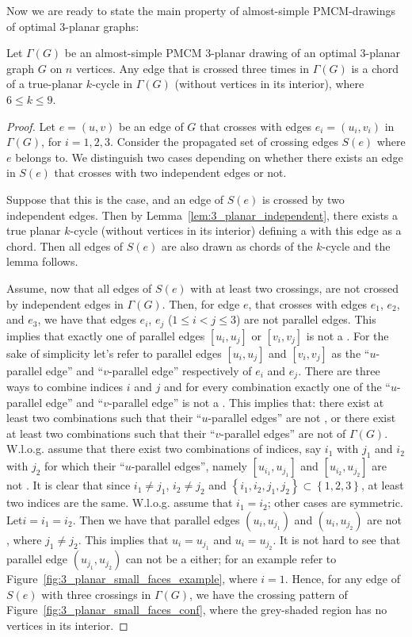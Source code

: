 Now we are ready to state the main property of almost-simple PMCM-drawings of optimal $3$-planar  graphs:

\begin{lemma}\label{lem:3_planar_small_faces}
Let $\Gamma(G)$ be an almost-simple PMCM $3$-planar drawing of an optimal $3$-planar graph $G$ on $n$ vertices. Any edge that is crossed three times in  $\Gamma(G)$ is a chord of a true-planar $k$-cycle in $\Gamma(G)$ (without vertices in its interior), where $6\leq k\leq 9$. 
\end{lemma}

\begin{proof}
Let $e=(u,v)$ be an edge of $G$ that crosses with edges $e_i=(u_i,v_i)$ in $\Gamma(G)$, for $i=1,2,3$. Consider the propagated set of crossing edges $S(e)$ where $e$ belongs to. We distinguish two cases depending on whether there exists an edge in $S(e)$ that crosses with two independent edges or not.

Suppose that this is the case, and an edge of $S(e)$ is crossed by two independent edges. Then by Lemma~\ref{lem:3_planar_independent}, there exists a true planar $k$-cycle (without vertices in its interior) defining a \pr with this edge as a chord. Then all edges of $S(e)$ are also drawn as chords of the $k$-cycle and the lemma follows.

Assume, now that all edges of $S(e)$ with at least two crossings, are not crossed by independent edges in $\Gamma(G)$. Then, for edge $e$, that crosses with edges $e_1$, $e_2$, and $e_3$, we have that edges $e_i$, $e_j$ ($1\leq i<j\leq 3$) are not parallel edges. This implies that exactly one of parallel edges $[u_i,u_j]$ or $[v_i,v_j]$ is not a \pe. For the sake of simplicity let's refer to parallel edges $[u_i,u_j]$ and $[v_i,v_j]$ as the ``$u$-parallel edge'' and ``$v$-parallel edge'' respectively of $e_i$ and $e_j$. 
There are three ways to combine indices $i$ and $j$ and for every combination exactly one of the ``$u$-parallel edge'' and ``$v$-parallel edge'' is not a \pe. This implies that: there exist at least two combinations such that their ``$u$-parallel edges'' are not \pes, or there exist at least two combinations such that their ``$v$-parallel edges'' are not \pes of $\Gamma(G)$. W.l.o.g. assume that there exist two combinations of indices, say $i_1$ with $j_1$ and $i_2$ with $j_2$ for which their ``$u$-parallel edges'', namely $[u_{i_1},u_{j_1}]$ and $[u_{i_2},u_{j_2}]$  are not \pes. It is clear that since $i_1\neq j_1$, $i_2\neq j_2$ and $\left\{i_1,i_2,j_1,j_2\right\}\subset\left\{1,2,3\right\}$, at least two indices are the same. W.l.o.g. assume that $i_1=i_2$; other cases are symmetric. Let$i=i_1=i_2$. Then we have that parallel edges  $(u_i,u_{j_1})$ and $(u_i,u_{j_2})$ are not \pes, where $j_1\neq j_2$. This implies that $u_i=u_{j_1}$ and $u_i=u_{j_2}$. It is not hard to see that parallel edge $(u_{j_1},u_{j_2})$ can not be a \pe either; for an example refer to Figure~\ref{fig:3_planar_small_faces_example}, where $i=1$. Hence, for any edge of $S(e)$ with three crossings in $\Gamma(G)$, we have the crossing pattern of Figure~\ref{fig:3_planar_small_faces_conf}, where the grey-shaded region has no vertices in its interior.


\end{proof}

